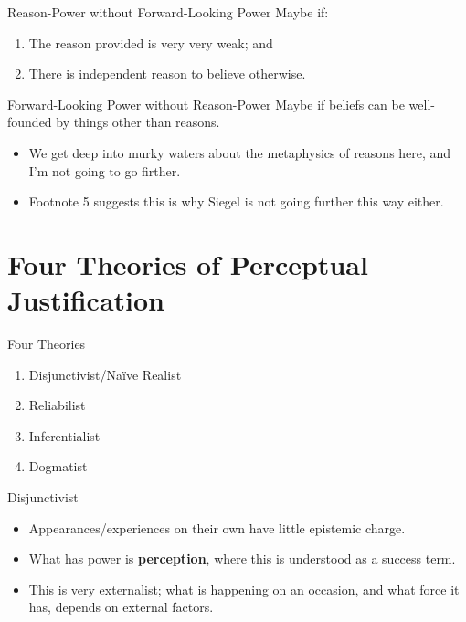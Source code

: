 \documentclass[
  17pt,
  letterpaper,
  ignorenonframetext,
  aspectratio=169,
  handout,
  xcolor={dvipsnames}]{beamer}
\providecommand{\tightlist}{%
  \setlength{\itemsep}{0pt}\setlength{\parskip}{0pt}}\usepackage{longtable,booktabs,array}
\begin{document}
\begin{frame}{Reason-Power without Forward-Looking Power}
\protect\hypertarget{reason-power-without-forward-looking-power}{}
Maybe if:

\begin{enumerate}[<+->]
[(a)]
\tightlist
\item
  The reason provided is very very weak; and
\item
  There is independent reason to believe otherwise.
\end{enumerate}
\end{frame}

\begin{frame}{Forward-Looking Power without Reason-Power}
\protect\hypertarget{forward-looking-power-without-reason-power}{}
Maybe if beliefs can be well-founded by things other than reasons.

\begin{itemize}[<+->]
\tightlist
\item
  We get deep into murky waters about the metaphysics of reasons here,
  and I'm not going to go firther.
\item
  Footnote 5 suggests this is why Siegel is not going further this way
  either.
\end{itemize}
\end{frame}

\hypertarget{four-theories-of-perceptual-justification}{%
\section{Four Theories of Perceptual
Justification}\label{four-theories-of-perceptual-justification}}

\begin{frame}{Four Theories}
\protect\hypertarget{four-theories}{}
\begin{enumerate}[<+->]
\tightlist
\item
  Disjunctivist/Naïve Realist
\item
  Reliabilist
\item
  Inferentialist
\item
  Dogmatist
\end{enumerate}
\end{frame}

\begin{frame}{Disjunctivist}
\protect\hypertarget{disjunctivist}{}
\begin{itemize}[<+->]
\tightlist
\item
  Appearances/experiences on their own have little epistemic charge.
\item
  What has power is \textbf{perception}, where this is understood as a
  success term.
\item
  This is very externalist; what is happening on an occasion, and what
  force it has, depends on external factors.
\end{itemize}
\end{frame}
\end{document}
